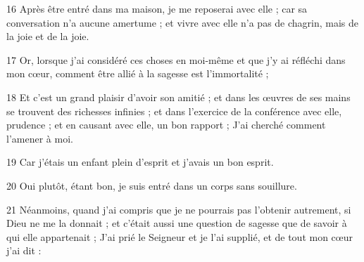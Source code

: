 \par 16 Après être entré dans ma maison, je me reposerai avec elle ; car sa conversation n'a aucune amertume ; et vivre avec elle n'a pas de chagrin, mais de la joie et de la joie.
\par 17 Or, lorsque j'ai considéré ces choses en moi-même et que j'y ai réfléchi dans mon cœur, comment être allié à la sagesse est l'immortalité ;
\par 18 Et c'est un grand plaisir d'avoir son amitié ; et dans les œuvres de ses mains se trouvent des richesses infinies ; et dans l'exercice de la conférence avec elle, prudence ; et en causant avec elle, un bon rapport ; J'ai cherché comment l'amener à moi.
\par 19 Car j'étais un enfant plein d'esprit et j'avais un bon esprit.
\par 20 Oui plutôt, étant bon, je suis entré dans un corps sans souillure.
\par 21 Néanmoins, quand j'ai compris que je ne pourrais pas l'obtenir autrement, si Dieu ne me la donnait ; et c'était aussi une question de sagesse que de savoir à qui elle appartenait ; J'ai prié le Seigneur et je l'ai supplié, et de tout mon cœur j'ai dit :


